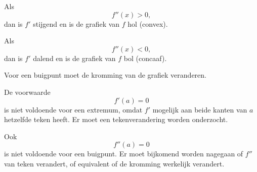 \documentclass{ximera}
\begin{document}
\begin{oefening}{\oefU\ESS}
\begin{oplossing}
Als
\[
f''(x)>0,
\]
dan is $f'$ stijgend en is de grafiek van $f$ hol (convex).

Als
\[
f''(x)<0,
\]
dan is $f'$ dalend en is de grafiek van $f$ bol (concaaf).

Voor een buigpunt moet de kromming van de grafiek veranderen.

De voorwaarde
\[
f'(a)=0
\]
is niet voldoende voor een extremum, omdat $f'$ mogelijk aan beide kanten
van $a$ hetzelfde teken heeft. Er moet een tekenverandering worden
onderzocht.

Ook
\[
f''(a)=0
\]
is niet voldoende voor een buigpunt. Er moet bijkomend worden nagegaan of
$f''$ van teken verandert, of equivalent of de kromming werkelijk verandert.

\end{oplossing}

\end{oefening}

\FVDendExercises
\end{document}
